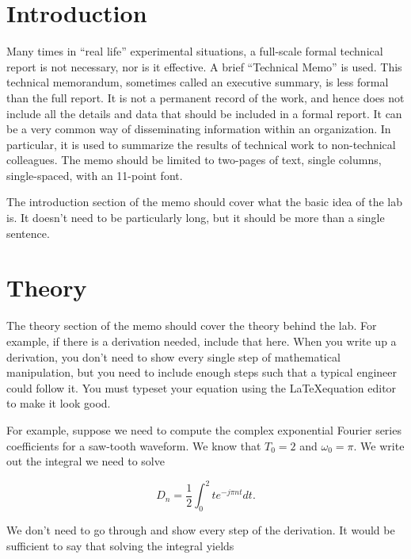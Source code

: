 \documentclass[11pt]{texMemo-gibbons}
\begin{document}
\maketitle

\section{Introduction}
\label{sec:introduction}

Many times in ``real life'' experimental situations,
a full-scale formal technical report is not necessary,
nor is it effective. A brief ``Technical Memo'' is used.
This technical memorandum, sometimes called an executive
summary, is less formal than the full report. It is
not a permanent record of the work, and hence does not
include all the details and data that should be included
in a formal report. It can be a very common way of disseminating
information within an organization. In particular, it
is used to summarize the results of technical work to
non-technical colleagues. The memo should be limited
to two-pages of text, single columns, single-spaced,
with an 11-point font.  

The introduction section of the memo should cover what
the basic idea of the lab is.  It doesn't need to be
particularly long, but it should be more than a single
sentence.  

\section{Theory}
\label{sec:theory}

The theory section of the memo should cover the theory
behind the lab.  For example, if there is a derivation
needed, include that here.  When you write up a derivation,
you don't need to show every single step of mathematical
manipulation, but you need to include enough steps such
that a typical engineer could follow it.  You must typeset
your equation using the \LaTeX  equation editor to make
it look good.

For example, suppose we need to compute the complex
exponential Fourier series coefficients for a saw-tooth
waveform.  We know that $T_0=2$ and $\omega_0=\pi$.
We write out the integral we need to solve

\begin{equation}
  \label{eq:1}
  D_n = \frac{1}{2}\int^2_0 t e^{-j\pi n t} dt.  
\end{equation}

We don't need to go through and show every step of the
derivation.  It would be sufficient to say that solving
the integral yields
\end{document}
